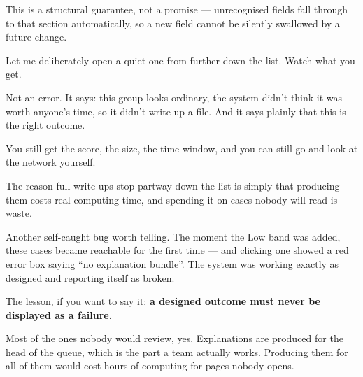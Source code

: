 \documentclass[11pt]{article}
\begin{document}
\begin{means}
This is a structural guarantee, not a promise --- unrecognised fields fall
through to that section automatically, so a new field cannot be silently
swallowed by a future change.
\end{means}


\begin{saythis}
Let me deliberately open a quiet one from further down the list.  Watch what you get.

Not an error. It says: this group looks ordinary, the system didn't think it
was worth anyone's time, so it didn't write up a file. And it says plainly that
this is the right outcome.

You still get the score, the size, the time window, and you can still go and
look at the network yourself.

The reason full write-ups stop partway down the list is simply that producing
them costs real computing time, and spending it on cases nobody will read is
waste.
\end{saythis}

\begin{means}
Another self-caught bug worth telling. The moment the Low band was added, these
cases became reachable for the first time --- and clicking one showed a red
error box saying ``no explanation bundle''. The system was working exactly as
designed and reporting itself as broken.

The lesson, if you want to say it: \textbf{a designed outcome must never be
displayed as a failure.}
\end{means}

\begin{asked}
 Most of the ones nobody would
review, yes. Explanations are produced for the head of the queue, which is the
part a team actually works. Producing them for all of them would cost hours of
computing for pages nobody opens.
\end{asked}


\end{document}
